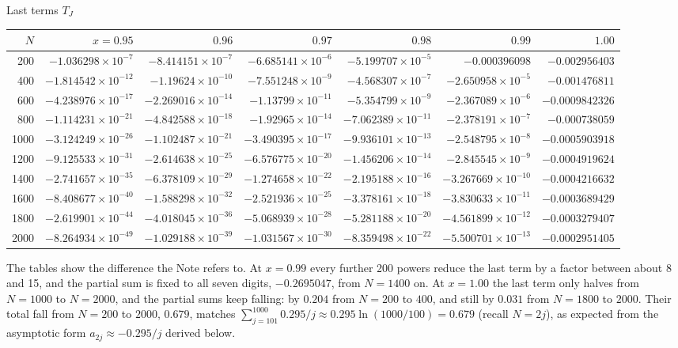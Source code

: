 \begin{center}\scriptsize
Last terms $T_J$\par\smallskip
\setlength{\tabcolsep}{2.7pt}
\begin{tabular}{r*{6}{r}}\toprule
$N$&$x=0.95$&$0.96$&$0.97$&$0.98$&$0.99$&$1.00$\\\midrule
200&$-1.036298\times10^{-7}$&$-8.414151\times10^{-7}$&$-6.685141\times10^{-6}$&$-5.199707\times10^{-5}$&$-0.000396098$&$-0.002956403$\\
400&$-1.814542\times10^{-12}$&$-1.19624\times10^{-10}$&$-7.551248\times10^{-9}$&$-4.568307\times10^{-7}$&$-2.650958\times10^{-5}$&$-0.001476811$\\
600&$-4.238976\times10^{-17}$&$-2.269016\times10^{-14}$&$-1.13799\times10^{-11}$&$-5.354799\times10^{-9}$&$-2.367089\times10^{-6}$&$-0.0009842326$\\
800&$-1.114231\times10^{-21}$&$-4.842588\times10^{-18}$&$-1.92965\times10^{-14}$&$-7.062389\times10^{-11}$&$-2.378191\times10^{-7}$&$-0.000738059$\\
1000&$-3.124249\times10^{-26}$&$-1.102487\times10^{-21}$&$-3.490395\times10^{-17}$&$-9.936101\times10^{-13}$&$-2.548795\times10^{-8}$&$-0.0005903918$\\
1200&$-9.125533\times10^{-31}$&$-2.614638\times10^{-25}$&$-6.576775\times10^{-20}$&$-1.456206\times10^{-14}$&$-2.845545\times10^{-9}$&$-0.0004919624$\\
1400&$-2.741657\times10^{-35}$&$-6.378109\times10^{-29}$&$-1.274658\times10^{-22}$&$-2.195188\times10^{-16}$&$-3.267669\times10^{-10}$&$-0.0004216632$\\
1600&$-8.408677\times10^{-40}$&$-1.588298\times10^{-32}$&$-2.521936\times10^{-25}$&$-3.378161\times10^{-18}$&$-3.830633\times10^{-11}$&$-0.0003689429$\\
1800&$-2.619901\times10^{-44}$&$-4.018045\times10^{-36}$&$-5.068939\times10^{-28}$&$-5.281188\times10^{-20}$&$-4.561899\times10^{-12}$&$-0.0003279407$\\
2000&$-8.264934\times10^{-49}$&$-1.029188\times10^{-39}$&$-1.031567\times10^{-30}$&$-8.359498\times10^{-22}$&$-5.500701\times10^{-13}$&$-0.0002951405$\\
\bottomrule\end{tabular}\end{center}

The tables show the difference the Note refers to. At $x=0.99$ every
further 200 powers reduce the last term by a factor between about 8 and
15, and the partial sum is fixed to all seven digits, $-0.2695047$, from
$N=1400$ on. At $x=1.00$ the last term only halves from $N=1000$ to
$N=2000$, and the partial sums keep falling: by $0.204$ from $N=200$ to
$400$, and still by $0.031$ from $N=1800$ to $2000$. Their total fall
from $N=200$ to $2000$, $0.679$, matches
$\sum_{j=101}^{1000}0.295/j\approx0.295\ln(1000/100)=0.679$ (recall
$N=2j$), as expected from the asymptotic form $a_{2j}\approx-0.295/j$
derived below.

